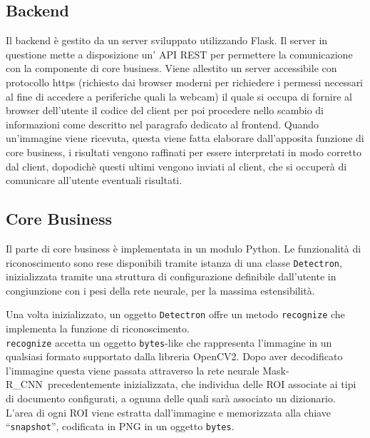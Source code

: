 \documentclass[12pt,a4paper]{article}
\newcommand{\mrcnn}{Mask-R\_CNN}
\begin{document}
\subsection{Backend}

Il backend è gestito da un server sviluppato utilizzando Flask. Il
server in questione mette a disposizione un' API REST per permettere la
comunicazione con la componente di core business. Viene
allestito un server accessibile con protocollo https (richiesto dai
browser moderni per richiedere i permessi necessari al fine di accedere
a periferiche quali la webcam) il quale si occupa di fornire al browser
dell'utente il codice del client per poi procedere nello scambio di
informazioni come descritto nel paragrafo dedicato al frontend. Quando
un'immagine viene ricevuta, questa viene fatta elaborare dall'apposita
funzione di core business, i risultati vengono raffinati per essere
interpretati in modo corretto dal client, dopodichè questi ultimi
vengono inviati al client, che si occuperà di comunicare all'utente
eventuali risultati.

\subsection{Core Business}

Il parte di core business è implementata in un modulo Python. Le
funzionalità di riconoscimento sono rese disponibili tramite istanza di
una classe \texttt{Detectron}, inizializzata tramite una struttura di
configurazione definibile dall'utente in congiunzione con i pesi della
rete neurale, per la massima estensibilità.

Una volta inizializzato, un oggetto \texttt{Detectron} offre un metodo
\texttt{recognize} che implementa la funzione di riconoscimento.\\
\texttt{recognize} accetta un oggetto \texttt{bytes}-like che
rappresenta l'immagine in un qualsiasi formato supportato dalla libreria
OpenCV2. Dopo aver decodificato l'immagine questa viene passata
attraverso la rete neurale \mrcnn\ precedentemente inizializzata, che
individua delle ROI associate ai tipi di documento configurati, a ognuna
delle quali sarà associato un dizionario. L'area di ogni ROI viene
estratta dall'immagine e memorizzata alla chiave ``\texttt{snapshot}'',
codificata in PNG in un oggetto \texttt{bytes}.
\end{document}
